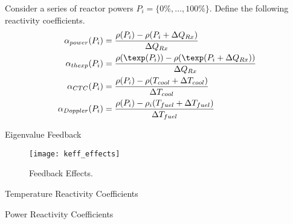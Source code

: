 \begin{frame}
  Consider a series of reactor powers $P_i = \{0\%,\ldots,100\%\}$.
  Define the following reactivity coefficients.
  \begin{align}
    \alpha_{power}(P_i) &= \frac{\rho(P_i) - \rho(P_i + \Delta Q_{Rx})}
      {\Delta Q_{Rx}} \\
    \alpha_{thexp}(P_i) &= \frac{\rho(\texp(P_i)) - 
      \rho(\texp(P_i + \Delta Q_{Rx}))}
      {\Delta Q_{Rx}} \\
    \alpha_{CTC}(P_i) &= \frac{\rho(P_i) - \rho(T_{cool}+\Delta T_{cool})}
      {\Delta T_{cool}} \\
    \alpha_{Doppler}(P_i) &= \frac{\rho(P_i) - \rho_i(T_{fuel}+\Delta T_{fuel})}
      {\Delta T_{fuel}}
  \end{align}
\end{frame}

\begin{frame}{Eigenvalue Feedback}
  \begin{figure}
    \centering
    \texttt{[image: keff\_effects]}
    \caption{\keff Feedback Effects.}
    \label{fig:keff_effects}
  \end{figure}
\end{frame}

\begin{frame}{Temperature Reactivity Coefficients}
  \begin{figure}
    \centering
    \hspace*{\fill}
  \end{figure}
\end{frame}

\begin{frame}{Power Reactivity Coefficients}
  \begin{figure}
    \centering
    \hspace*{\fill}
  \end{figure}
\end{frame}
